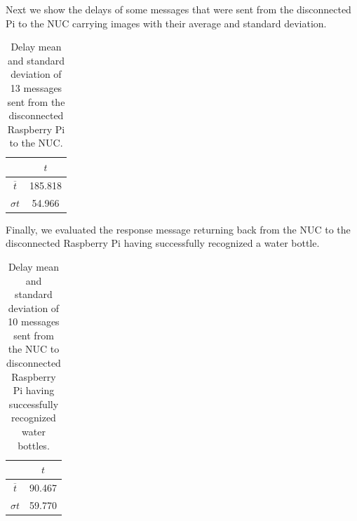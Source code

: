\noindent Next we show the delays of some messages that were sent from the disconnected Pi to the NUC carrying images with their average and standard deviation.
\begin{table}[H]
	\centering
\begin{tabular}{c|c}\toprule
		  & $t$  \\ \midrule
$ \overline{t} $&	185.818\\
$ \sigma t $&	54.966\\
\end{tabular}
	\caption{Delay mean and standard deviation of 13 messages sent from the disconnected Raspberry Pi to the NUC.}
	\label{table:DIS2}
\end{table}

\noindent Finally, we evaluated the response message returning back from the NUC to the disconnected Raspberry Pi having successfully recognized a water bottle.

\begin{table}[H]
	\centering
	\begin{tabular}{c|c}\toprule
		& $t$  \\ \midrule
$ \overline{t} $& 	90.467\\
$ \sigma t $&	59.770\\
	\end{tabular}
	\caption{Delay mean and standard deviation of 10 messages sent from the NUC to disconnected Raspberry Pi having successfully recognized water bottles.}
	\label{table:DIS3}
\end{table}


